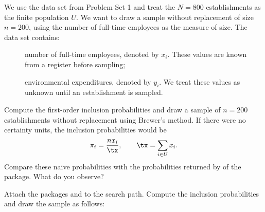 




\begin{Problem}\label{problem:pps}
    We use the data set  from Problem Set 1 and treat the
    $N = 800$ establishments as the finite population $U$. We want to draw a
    \PPS sample without replacement of size $n = 200$, using the number of
    full-time employees as the measure of size. The data set contains:
    \begin{description}
        \item[] number of full-time employees, denoted
            by $x_i$. These values are known from a register before sampling;
        \item[] environmental expenditures, denoted
            by $y_i$. We treat these values as unknown until an establishment
            is sampled.
    \end{description}

\begin{Subtask}
    \item Compute the first-order inclusion probabilities and draw a \PPS sample
        of $n = 200$ establishments without replacement using Brewer's method.
        If there were no certainty units, the inclusion probabilities would be
        \begin{equation*}
            \pi_i = \frac{n x_i}{\tx},
            \qquad
            \tx = \sum_{i \in U} x_i.
        \end{equation*}
        Compare these naive probabilities with the probabilities returned by
         of the  package. What do you
        observe?

        \begin{Rhint}
            Attach the packages  and  to the
            search path. Compute the inclusion probabilities and draw the
            sample as follows:

        \end{Rhint}


\end{Subtask}
\end{Problem}

